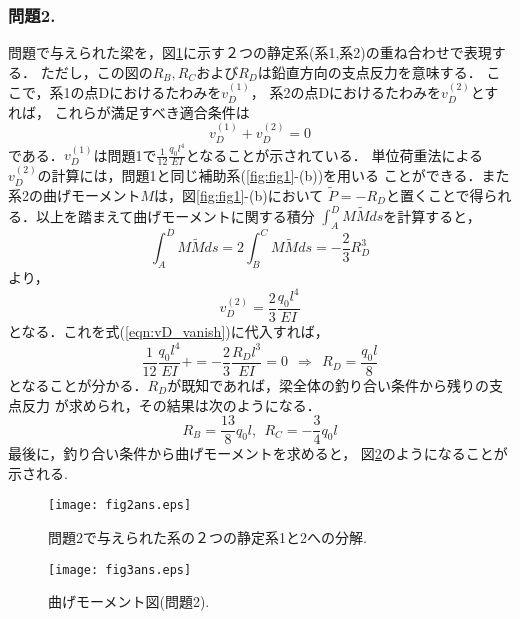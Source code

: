 \documentclass[10pt,a4j]{jarticle}
\begin{document}
\subsubsection*{問題2.}
問題で与えられた梁を，図\ref{fig:fig2}に示す２つの静定系(系1,系2)の重ね合わせで表現する．
ただし，この図の$R_B,R_C$および$R_D$は鉛直方向の支点反力を意味する．
ここで，系1の点Dにおけるたわみを$v^{(1)}_D$，
系2の点Dにおけるたわみを$v^{(2)}_D$とすれば，
これらが満足すべき適合条件は
\begin{equation}
	v^{(1)}_D
	+
	v^{(2)}_D
	=0
	\label{eqn:vD_vanish}
\end{equation}
である．$v_D^{(1)}$は問題1で$\frac{1}{12}\frac{q_0l^4}{EI}$となることが示されている．
単位荷重法による$v^{(2)}_D$の計算には，問題1と同じ補助系(\ref{fig:fig1}-(b))を用いる
ことができる．また系2の曲げモーメント$M$は，図\ref{fig:fig1}-(b)において
$\tilde P=-R_D$と置くことで得られる．以上を踏まえて曲げモーメントに関する積分
$\int_A^DM\tilde M ds $を計算すると，
\begin{equation}
	\int_A^D M\tilde Mds= 2\int_B^CM \tilde Mds=-\frac{2}{3}R_D^3
\end{equation}
より，
\begin{equation}
	v_D^{(2)}=\frac{2}{3}\frac{q_0l^4}{EI}
\end{equation}
となる．これを式(\ref{eqn:vD_vanish})に代入すれば，
\begin{equation}
	\frac{1}{12}\frac{q_0l^4}{EI}
	+
	=-\frac{2}{3}\frac{R_Dl^3}{EI}
	=0 \ \ \Rightarrow \ \ 
	R_D=\frac{q_0l}{8}
\end{equation}
となることが分かる．$R_D$が既知であれば，梁全体の釣り合い条件から残りの支点反力
が求められ，その結果は次のようになる．
\begin{equation}
	R_B=\frac{13}{8}q_0l, \ \ R_C=-\frac{3}{4}q_0l
\end{equation}
最後に，釣り合い条件から曲げモーメントを求めると，
図\ref{fig:fig3}のようになることが示される.
\begin{figure}
	\vspace{10mm}
	\begin{center}
	\texttt{[image: fig2ans.eps]} 
	\end{center}
	\caption{問題2で与えられた系の２つの静定系1と2への分解. } 
	\label{fig:fig2}
\end{figure}
\begin{figure}
	\vspace{10mm}
	\begin{center}
	\texttt{[image: fig3ans.eps]} 
	\end{center}
	\caption{曲げモーメント図(問題2). } 
	\label{fig:fig3}
\end{figure}
\end{document}
